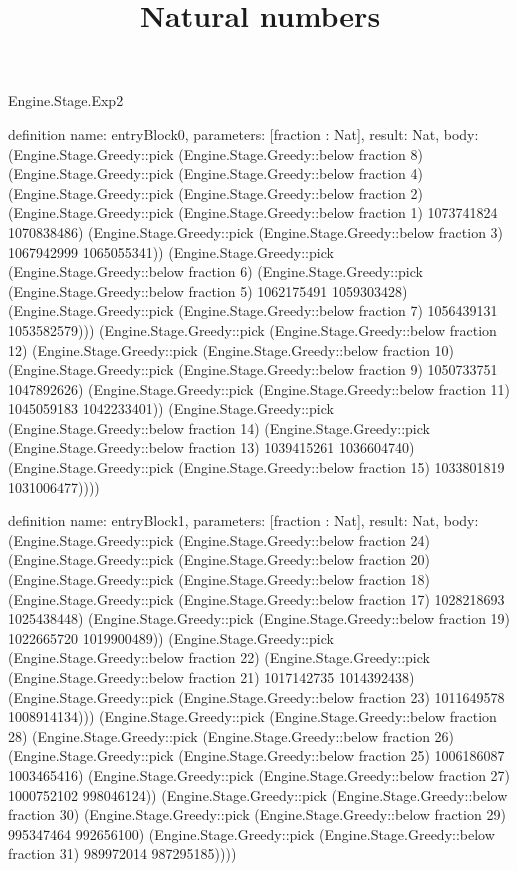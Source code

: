 \begin{lexlean}{Engine.Stage.Exp2}
\title{Natural numbers}
\begin{semanticmodule}
definition{
  name: entryBlock0,
  parameters: [fraction : Nat],
  result: Nat,
  body: (Engine.Stage.Greedy::pick (Engine.Stage.Greedy::below fraction 8) (Engine.Stage.Greedy::pick (Engine.Stage.Greedy::below fraction 4) (Engine.Stage.Greedy::pick (Engine.Stage.Greedy::below fraction 2) (Engine.Stage.Greedy::pick (Engine.Stage.Greedy::below fraction 1) 1073741824 1070838486) (Engine.Stage.Greedy::pick (Engine.Stage.Greedy::below fraction 3) 1067942999 1065055341)) (Engine.Stage.Greedy::pick (Engine.Stage.Greedy::below fraction 6) (Engine.Stage.Greedy::pick (Engine.Stage.Greedy::below fraction 5) 1062175491 1059303428) (Engine.Stage.Greedy::pick (Engine.Stage.Greedy::below fraction 7) 1056439131 1053582579))) (Engine.Stage.Greedy::pick (Engine.Stage.Greedy::below fraction 12) (Engine.Stage.Greedy::pick (Engine.Stage.Greedy::below fraction 10) (Engine.Stage.Greedy::pick (Engine.Stage.Greedy::below fraction 9) 1050733751 1047892626) (Engine.Stage.Greedy::pick (Engine.Stage.Greedy::below fraction 11) 1045059183 1042233401)) (Engine.Stage.Greedy::pick (Engine.Stage.Greedy::below fraction 14) (Engine.Stage.Greedy::pick (Engine.Stage.Greedy::below fraction 13) 1039415261 1036604740) (Engine.Stage.Greedy::pick (Engine.Stage.Greedy::below fraction 15) 1033801819 1031006477))))
}

definition{
  name: entryBlock1,
  parameters: [fraction : Nat],
  result: Nat,
  body: (Engine.Stage.Greedy::pick (Engine.Stage.Greedy::below fraction 24) (Engine.Stage.Greedy::pick (Engine.Stage.Greedy::below fraction 20) (Engine.Stage.Greedy::pick (Engine.Stage.Greedy::below fraction 18) (Engine.Stage.Greedy::pick (Engine.Stage.Greedy::below fraction 17) 1028218693 1025438448) (Engine.Stage.Greedy::pick (Engine.Stage.Greedy::below fraction 19) 1022665720 1019900489)) (Engine.Stage.Greedy::pick (Engine.Stage.Greedy::below fraction 22) (Engine.Stage.Greedy::pick (Engine.Stage.Greedy::below fraction 21) 1017142735 1014392438) (Engine.Stage.Greedy::pick (Engine.Stage.Greedy::below fraction 23) 1011649578 1008914134))) (Engine.Stage.Greedy::pick (Engine.Stage.Greedy::below fraction 28) (Engine.Stage.Greedy::pick (Engine.Stage.Greedy::below fraction 26) (Engine.Stage.Greedy::pick (Engine.Stage.Greedy::below fraction 25) 1006186087 1003465416) (Engine.Stage.Greedy::pick (Engine.Stage.Greedy::below fraction 27) 1000752102 998046124)) (Engine.Stage.Greedy::pick (Engine.Stage.Greedy::below fraction 30) (Engine.Stage.Greedy::pick (Engine.Stage.Greedy::below fraction 29) 995347464 992656100) (Engine.Stage.Greedy::pick (Engine.Stage.Greedy::below fraction 31) 989972014 987295185))))
}


\end{semanticmodule}
\end{lexlean}
